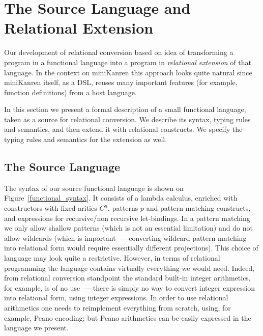 \section{The Source Language and Relational Extension}

Our development of relational conversion based on idea of transforming a program in a functional
language into a program in \emph{relational extension} of that language. In the context on 
miniKanren this approach looks quite natural since miniKanren itself, as a DSL, reuses 
many important features (for example, function definitions) from a host language.

In this section we present a formal description of a small functional language, taken as a source
for relational conversion. We describe its syntax, typing rules and semantics, and then extend it
with relational constructs. We specify the typing rules and semantics for the extension as well.

\subsection{The Source Language}
\label{source_language}

The syntax of our source functional language is shown on Figure~\ref{functional_syntax}. It consists of a lambda calculus, 
enriched with constructors with fixed arities $C^n$, patterns $p$ and pattern-matching constructs, and  
expressions for recursive/non recursive let-bindings.
In a pattern matching we only allow shallow
patterns (which is not an essential limitation) and do not allow wildcards (which is important~--- converting 
wildcard pattern matching into relational form would require essentially different projections). This choice of language may 
look quite a restrictive. However, in terms of relational programming the language contains virtually everything we would need. Indeed, from
relational conversion standpoint the standard built-in integer arithmetics, for example, is of no use~--- 
there is simply no way to convert integer expression into relational form, using integer expressions. In order to use relational 
arithmetics one needs to reimplement everything from scratch, using, for example, Peano encoding; but Peano arithmetics can be
easily expressed in the language we present.

